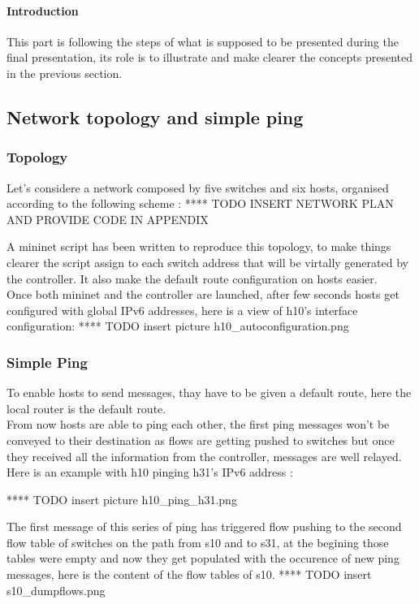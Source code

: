 \documentclass{article}
\begin{document}
\paragraph{Introduction}
This part is following the steps of what is supposed to be presented
during the final presentation, its role is to illustrate and make
clearer the concepts presented in the previous section.

\subsection{Network topology and simple ping}

\subsubsection{Topology}
Let's considere a network composed by five switches and six hosts,
organised according to the following scheme : 
**** TODO INSERT NETWORK PLAN AND PROVIDE CODE IN APPENDIX

A mininet script has been written to reproduce this topology, to make
things clearer the script assign to each switch address that will be
virtally generated by the controller. It also make the default route
configuration on hosts easier.\\
\newline
Once both mininet and the controller are launched, after few seconds
hosts get configured with global IPv6 addresses, here is a view of
h10's interface configuration:
**** TODO insert picture h10_autoconfiguration.png
     
\subsubsection{Simple Ping}
To enable hosts to send messages, thay have to be given a default
route, here the local router is the default route.\\
\newline
From now hosts are able to ping each other, the first ping messages
won't be conveyed to their destination as flows are getting pushed
to switches but once they received all the information from the
controller, messages are well relayed. Here is an example with h10
pinging h31's IPv6 address : 

**** TODO insert picture h10_ping_h31.png

The first message of this series of ping has triggered flow pushing to
the second flow table of switches on the path from s10 and to s31, at
the begining those tables were empty and now they get populated with
the occurence of new ping messages, here is the content of the flow
tables of s10.
**** TODO insert s10_dumpflows.png
\end{document}
